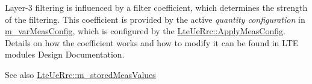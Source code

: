 Layer-\/3 filtering is influenced by a filter coefficient, which determines the strength of the filtering. This coefficient is provided by the active {\itshape quantity configuration} in \hyperlink{classns3_1_1LteUeRrc_a27a7773eedfdab964d2514d9eeb1c562}{m\+\_\+var\+Meas\+Config}, which is configured by the \hyperlink{classns3_1_1LteUeRrc_a2cd87b415e4e40dfbaa9d08c406bd9bd}{Lte\+Ue\+Rrc\+::\+Apply\+Meas\+Config}. Details on how the coefficient works and how to modify it can be found in L\+TE module\textquotesingle{}s Design Documentation.

\begin{DoxySeeAlso}{See also}
\hyperlink{classns3_1_1LteUeRrc_a93094dcd5c235b2e2a8a299125100a57}{Lte\+Ue\+Rrc\+::m\+\_\+stored\+Meas\+Values} 
\end{DoxySeeAlso}

